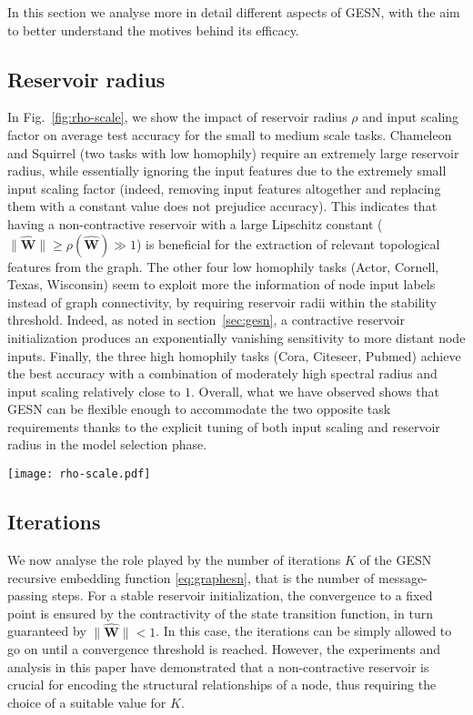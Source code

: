 \documentclass[final,5p,times,twocolumn]{elsarticle}
\begin{document}
In this section we analyse more in detail different aspects of GESN, with the aim to better understand the motives behind its efficacy.

\subsection{Reservoir radius}

In Fig.~\ref{fig:rho-scale}, we show the impact of reservoir radius $\rho$ and input scaling factor on average test accuracy for the small to medium scale tasks.
Chameleon and Squirrel (two tasks with low homophily) require an extremely large reservoir radius, while essentially ignoring the input features due to the extremely small input scaling factor (indeed, removing input features altogether and replacing them with a constant value does not prejudice accuracy).
This indicates that having a non-contractive reservoir with a large Lipschitz constant ($\lVert \mathbf{\hat{W}} \rVert \geq \rho(\mathbf{\hat{W}}) \gg 1$) is beneficial for the extraction of relevant topological features from the graph.
The other four low homophily tasks (Actor, Cornell, Texas, Wisconsin) seem to exploit more the information of node input labels instead of graph connectivity, by requiring reservoir radii within the stability threshold.
Indeed, as noted in section~\ref{sec:gesn}, a contractive reservoir initialization produces an exponentially vanishing sensitivity to more distant node inputs.
Finally, the three high homophily tasks (Cora, Citeseer, Pubmed) achieve the best accuracy with a combination of moderately high spectral radius and input scaling relatively close to $1$.
Overall, what we have observed shows that GESN can be flexible enough to accommodate the two opposite task requirements thanks to the explicit tuning of both input scaling and reservoir radius in the model selection phase.

\begin{figure*}
	\centering
	\texttt{[image: rho-scale.pdf]}
	\caption{Impact of input scaling and reservoir radius on test accuracy (other parameters set by model selection).}
	\label{fig:rho-scale}
\end{figure*}

\subsection{Iterations}

We now analyse the role played by the number of iterations $K$ of the GESN recursive embedding function \eqref{eq:graphesn}, that is the number of message-passing steps.
For a stable reservoir initialization, the convergence to a fixed point is ensured by the contractivity of the state transition function, in turn guaranteed by $\lVert \mathbf{\hat{W}} \rVert < 1$.
In this case, the iterations can be simply allowed to go on until a convergence threshold is reached.
However, the experiments and analysis in this paper have demonstrated that a non-contractive reservoir is crucial for encoding the structural relationships of a node, thus requiring the choice of a suitable value for $K$.
\end{document}
